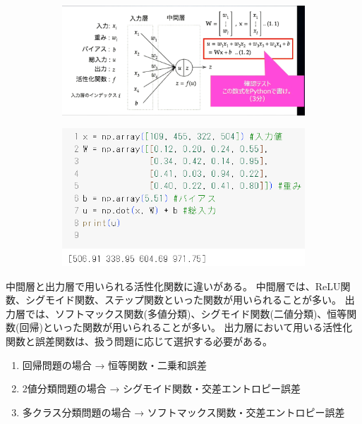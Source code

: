 \documentclass{ltjsarticle}
\begin{document}
\begin{figure}[ht]
  \centering
  \begin{subfigure}[b]{0.45\textwidth}
    \centering
    \includegraphics[width=\textwidth]{./capture/confirm_test/day1_02_3.png}
    \caption{}
    \label{fig:day1_02_3}
  \end{subfigure}
  \hfill
  \begin{subfigure}[b]{0.45\textwidth}
    \centering
    \includegraphics[width=\textwidth]{./capture/confirm_test/day1_02_4.png}
    \caption{}
    \label{fig:day1_02_4}
  \end{subfigure}
  \caption{}
\end{figure}

中間層と出力層で用いられる活性化関数に違いがある。
中間層では、ReLU関数、シグモイド関数、ステップ関数といった関数が用いられることが多い。
出力層では、ソフトマックス関数(多値分類)、シグモイド関数(二値分類)、恒等関数(回帰)といった関数が用いられることが多い。
出力層において用いる活性化関数と誤差関数は、扱う問題に応じて選択する必要がある。
\begin{enumerate}
  \item 回帰問題の場合 → 恒等関数・二乗和誤差
  \item 2値分類問題の場合 → シグモイド関数・交差エントロピー誤差
  \item 多クラス分類問題の場合 → ソフトマックス関数・交差エントロピー誤差
\end{enumerate}
\end{document}
